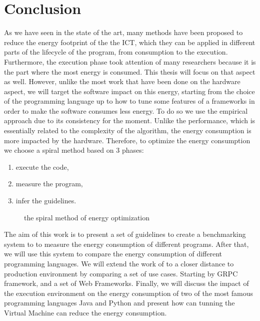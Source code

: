 \section{Conclusion}
As we have seen in the state of the art, many methods have been proposed to reduce the energy footprint of the the ICT, which they can be applied in different parts of the lifecycle of the program, from consumption to the execution.
Furthermore, the execution phase took attention of many researchers because it is the part where the most energy is consumed.
This thesis will focus on that aspect as well.
However, unlike the most work that have been done on the hardware aspect, we will target the software impact on this energy, starting from the choice of the programming language up to how to tune some features of a frameworks in order to make the software consumes less energy.
To do so we use the empirical approach due to its consistency for the moment.
Unlike the performance, which is essentially related to the complexity of the algorithm, the energy consumption is more impacted by the hardware.
Therefore, to optimize the energy consumption we choose a spiral method based on 3 phases:
\begin{enumerate}
    \item execute the code,
    \item measure the program,
    \item infer the guidelines.
\end{enumerate}

\begin{figure}[!hbt]
    \caption{the spiral method of energy optimization }\label{fig:spirals}
\end{figure}

The aim of this work is to present a set of guidelines to create a benchmarking system to to measure the energy consumption of different programs.
After that, we will use this system to compare the energy consumption of different programming languages. We will extend the work of \citeauthor{pereira_energy_2017} to a closer distance to production environment by comparing a set of use cases.
Starting by GRPC framework, and a set of Web Frameworks.
Finally, we will discuss the impact of the execution environment on the energy consumption of two of the most famous programming languages Java and Python and present how can tunning the Virtual Machine can reduce the energy consumption.
